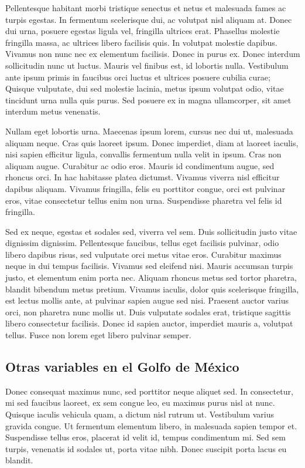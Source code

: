 \documentclass[
]{article}
\begin{document}
Pellentesque habitant morbi tristique senectus et netus et malesuada fames ac turpis egestas. In fermentum scelerisque dui, ac volutpat nisl aliquam at. Donec dui urna, posuere egestas ligula vel, fringilla ultrices erat. Phasellus molestie fringilla massa, ac ultrices libero facilisis quis. In volutpat molestie dapibus. Vivamus non nunc nec ex elementum facilisis. Donec in purus ex. Donec interdum sollicitudin nunc ut luctus. Mauris vel finibus est, id lobortis nulla. Vestibulum ante ipsum primis in faucibus orci luctus et ultrices posuere cubilia curae; Quisque vulputate, dui sed molestie lacinia, metus ipsum volutpat odio, vitae tincidunt urna nulla quis purus. Sed posuere ex in magna ullamcorper, sit amet interdum metus venenatis.

Nullam eget lobortis urna. Maecenas ipsum lorem, cursus nec dui ut, malesuada aliquam neque. Cras quis laoreet ipsum. Donec imperdiet, diam at laoreet iaculis, nisi sapien efficitur ligula, convallis fermentum nulla velit in ipsum. Cras non aliquam augue. Curabitur ac odio eros. Mauris id condimentum augue, sed rhoncus orci. In hac habitasse platea dictumst. Vivamus viverra nisl efficitur dapibus aliquam. Vivamus fringilla, felis eu porttitor congue, orci est pulvinar eros, vitae consectetur tellus enim non urna. Suspendisse pharetra vel felis id fringilla.

Sed ex neque, egestas et sodales sed, viverra vel sem. Duis sollicitudin justo vitae dignissim dignissim. Pellentesque faucibus, tellus eget facilisis pulvinar, odio libero dapibus risus, sed vulputate orci metus vitae eros. Curabitur maximus neque in dui tempus facilisis. Vivamus sed eleifend nisi. Mauris accumsan turpis justo, et elementum enim porta nec. Aliquam rhoncus metus sed tortor pharetra, blandit bibendum metus pretium. Vivamus iaculis, dolor quis scelerisque fringilla, est lectus mollis ante, at pulvinar sapien augue sed nisi. Praesent auctor varius orci, non pharetra nunc mollis ut. Duis vulputate sodales erat, tristique sagittis libero consectetur facilisis. Donec id sapien auctor, imperdiet mauris a, volutpat tellus. Fusce non lorem eget libero pulvinar semper.

\hypertarget{otras-variables-en-el-golfo-de-muxe9xico}{%
\subsection{Otras variables en el Golfo de México}\label{otras-variables-en-el-golfo-de-muxe9xico}}

Donec consequat maximus nunc, sed porttitor neque aliquet sed. In consectetur, mi sed faucibus laoreet, ex sem congue leo, eu maximus purus nisl at nunc. Quisque iaculis vehicula quam, a dictum nisl rutrum ut. Vestibulum varius gravida congue. Ut fermentum elementum libero, in malesuada sapien tempor et. Suspendisse tellus eros, placerat id velit id, tempus condimentum mi. Sed sem turpis, venenatis id sodales ut, porta vitae nibh. Donec suscipit porta lacus eu blandit.
\end{document}
